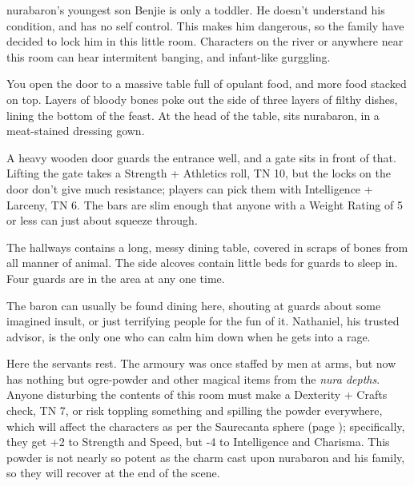 \begin{multicols}{2}

\Gls{nurabaron}'s youngest son Benjie is only a toddler.
He doesn't understand his condition, and has no self control.
This makes him dangerous, so the family have decided to lock him in this little room.
Characters on the river or anywhere near this room can hear intermitent banging, and infant-like gurggling.


\deephobgoblin


\begin{boxtext}

	You open the door to a massive table full of opulant food, and more food stacked on top.  Layers of bloody bones poke out the side of three layers of filthy dishes, lining the bottom of the feast.  At the head of the table, sits \gls{nurabaron}, in a meat-stained dressing gown.

\end{boxtext}

A heavy wooden door guards the entrance well, and a gate sits in front of that.  Lifting the gate takes a Strength + Athletics roll, TN 10, but the locks on the door don't give much resistance; players can pick them with Intelligence + Larceny, TN 6.  The bars are slim enough that anyone with a Weight Rating of 5 or less can just about squeeze through.

The hallways contains a long, messy dining table, covered in scraps of bones from all manner of animal.  The side alcoves contain little beds for guards to sleep in.  Four guards are in the area at any one time.

The baron can usually be found dining here, shouting at guards about some imagined insult, or just terrifying people for the fun of it.  Nathaniel, his trusted advisor, is the only one who can calm him down when he gets into a rage.




Here the servants rest.
The armoury was once staffed by men at arms, but now has nothing but ogre-powder and other magical items from the \textit{nura depths}.
Anyone disturbing the contents of this room must make a Dexterity + Crafts check, TN 7, or risk toppling something and spilling the powder everywhere, which will affect the characters as per the Saurecanta sphere (page \pageref{saurecanta}); specifically, they get +2 to Strength and Speed, but -4 to Intelligence and Charisma.
This powder is not nearly so potent as the charm cast upon \gls{nurabaron} and his family, so they will recover at the end of the scene.


\end{multicols}
